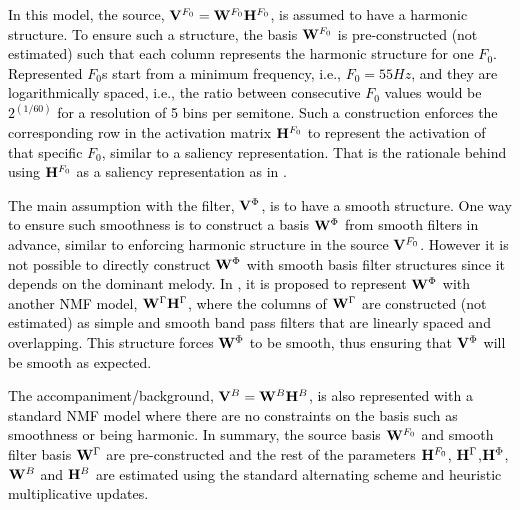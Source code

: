 \documentclass{article}
\newcommand{\db}[1]{{\textcolor{black}{#1}}}
\newcommand{\jb}[1]{{\textcolor{black}{#1}}}
\newcommand{\jbcor}[2]{{\textcolor{black}{#2}}}
\begin{document}
\db{In this model, the source, $\mathbf{V}^{F_0}=\mathbf{W}^{F_{0}}\mathbf{H}^{F_{0}}$, is assumed to have a harmonic structure. To ensure such a structure, the basis $\mathbf{W}^{F_{0}}$ is pre-constructed (not estimated) such that each column represents the harmonic structure for one $F_0$. Represented $F_0$s start from a minimum frequency, i.e., $F_0=55Hz$, and they are logarithmically spaced, i.e., the ratio between consecutive $F_0$ values would be $2^{(1/60)}$ for a resolution of 5 bins per semitone. Such a construction enforces the corresponding row in the activation matrix $\mathbf{H}^{F_{0}}$ to represent the activation of that specific $F_0$, similar to a saliency representation. That is the rationale behind using $\mathbf{H}^{F_{0}}$ as \jb{a} saliency representation as in \cite{Durrieu,Durrieu-2,bittner2016_comparison}.  }

\db{The main assumption with the filter, $\mathbf{V}^{\Phi}$, is to have a smooth structure. One way to ensure such smoothness is to construct a basis $\mathbf{W}^{\Phi}$ from smooth filters in advance, similar to enforcing harmonic structure in the source $\mathbf{V}^{F_0}$. However it is not possible to directly construct $\mathbf{W}^{\Phi}$ with smooth basis filter structures since it depends on the dominant melody. In \cite{Durrieu-2}, it is proposed to represent $\mathbf{W}^{\Phi}$ with another NMF model, $\mathbf{W}^{\Gamma} \mathbf{H}^{\Gamma}$, where the columns of $\mathbf{W}^{\Gamma}$ are constructed (not estimated) as simple and smooth band pass filters that are linearly spaced and overlapping. This structure \jbcor{enforces}{forces} $\mathbf{W}^{\Phi}$ to be smooth,}
\jb{thus ensuring that $\mathbf{V}^{\Phi}$ will be smooth as expected.}

\db{The accompaniment/background, $\mathbf{V}^{B}=\mathbf{W}^{B}\mathbf{H}^{B}$, is also represented with a standard NMF model where there are no constraints on the basis such as smoothness or being harmonic. In summary, \jb{the} source basis $\mathbf{W}^{F_{0}}$ and smooth filter basis $\mathbf{W}^{\Gamma}$ are pre-constructed and the rest of the parameters $\mathbf{H}^{F_{0}}$, $\mathbf{H}^{\Gamma}$,$\mathbf{H}^{\Phi}$,$\mathbf{W}^{B}$ and $\mathbf{H}^{B}$ are estimated using the standard alternating scheme and heuristic multiplicative updates.}

\end{document}
